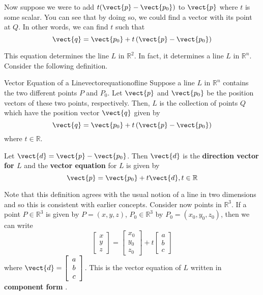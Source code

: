 Now suppose we were to add $t(\vect{p} - \vect{p_0})$ to $\vect{p}$ where $t$ is some scalar.
You can see that by doing so, we could find a vector with its point at $Q$. In other words, we can find $t$ such that 
\begin{equation*}
\vect{q} = \vect{p_0} + t \left( \vect{p}- \vect{p_0}\right)
\end{equation*}

This equation determines the line $L$ in $\mathbb{R}^2$. In fact, it determines a line $L$ in $\mathbb{R}^n$. Consider the following definition.

\begin{definition}{Vector Equation of a Line}{vectorequationofline}
Suppose a line $L$ in $\mathbb{R}^{n}$ contains the two
different points $P$ and 
$P_0$. Let $\vect{p}$ and $\vect{p_0}$ be the position vectors of these two points, respectively.
Then, $L$ is the collection of points $Q$ which have the position vector $\vect{q}$ given by
\begin{equation*}
\vect{q}=\vect{p_0}+t\left( \vect{p}-\vect{p_0}\right)
\end{equation*}
where $t\in \mathbb{R}$. 

Let $\vect{d} = \vect{p} - \vect{p_0}$. Then $\vect{d}$ is the \textbf{direction vector for $L$}  and the \textbf{vector equation} for $L$ is given by 
\begin{equation*}
\vect{p}=\vect{p_0}+t\vect{d}, t\in\mathbb{R}
\end{equation*}
\end{definition}

Note that this definition agrees with the usual notion of a
line in two dimensions and so this is consistent with earlier concepts. Consider now points in $\mathbb{R}^3$. If a point $P \in \mathbb{R}^3$ is given by $P = \left( x,y,z \right)$, $P_0 \in \mathbb{R}^3$ by $P_0 = \left( x_0, y_0, z_0 \right)$, then we can write
\begin{equation*}
\left[
\begin{array}{c}
x \\
y \\
z 
\end{array}
\right] = 
\left[
\begin{array}{c}
x_0 \\
y_0 \\
z_0 
\end{array}
\right]
+
t
\left[
\begin{array}{c}
a \\
b \\
c 
\end{array}
\right]
\end{equation*}
where $\vect{d} = \left[
\begin{array}{c}
a \\
b \\
c 
\end{array}
\right]$. This is the vector equation of $L$ written in \textbf{component form} .

